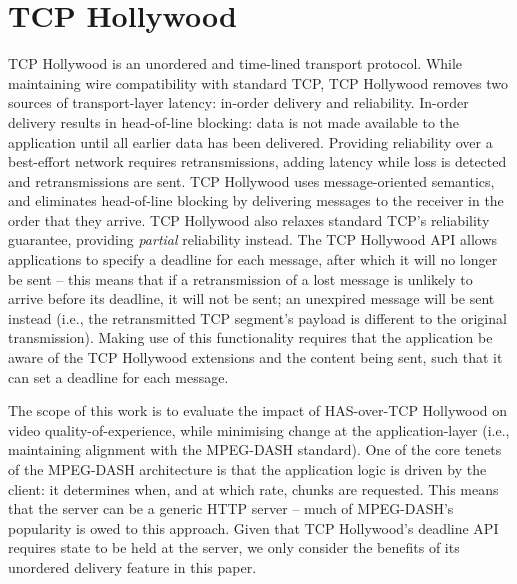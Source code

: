 \section{TCP Hollywood}
\label{sec:hlywd}

TCP Hollywood \cite{mcquistin2016tcp, mcquistin2016tcp2} is an unordered and time-lined
transport protocol. While maintaining wire compatibility with standard TCP, TCP Hollywood
removes two sources of transport-layer latency: in-order delivery and reliability.
In-order delivery results in head-of-line blocking: data is not made available to the
application until all earlier data has been delivered. Providing reliability over a
best-effort network requires retransmissions, adding latency while loss is detected and
retransmissions are sent. TCP Hollywood uses message-oriented semantics, and eliminates
head-of-line blocking by delivering messages to the receiver in the order that they
arrive. TCP Hollywood also relaxes standard TCP's reliability guarantee, providing
\emph{partial} reliability instead. The TCP Hollywood API allows applications to specify a
deadline for each message, after which it will no longer be sent -- this means that if a
retransmission of a lost message is unlikely to arrive before its deadline, it will not be
sent; an unexpired message will be sent instead (i.e., the retransmitted TCP segment's
payload is different to the original transmission). Making use of this functionality
requires that the application be aware of the TCP Hollywood extensions and the content
being sent, such that it can set a deadline for each message.

The scope of this work is to evaluate the impact of HAS-over-TCP Hollywood on video
quality-of-experience, while minimising change at the application-layer (i.e., maintaining
alignment with the MPEG-DASH standard). One of the core tenets of the MPEG-DASH
architecture is that the application logic is driven by the client: it determines when,
and at which rate, chunks are requested. This means that the server can be a generic HTTP
server -- much of MPEG-DASH's popularity is owed to this approach. Given that TCP
Hollywood's deadline API requires state to be held at the server, we only consider the
benefits of its unordered delivery feature in this paper. 


